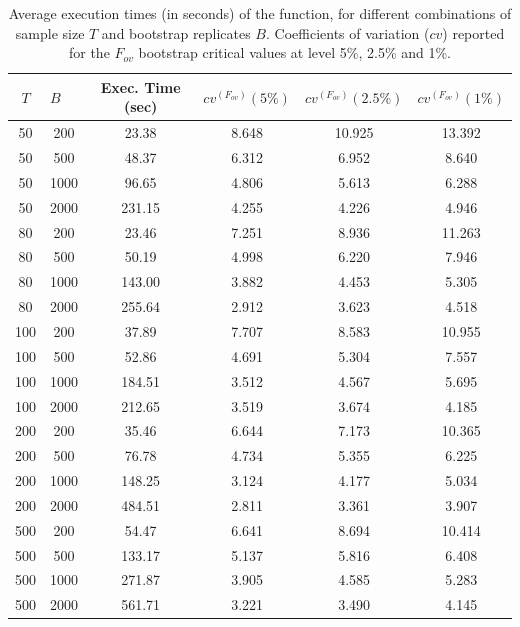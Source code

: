 \begin{table}[htbp]
  \centering
    \begin{tabular}{cccccc}
    \multicolumn{1}{c}{$T$} & \multicolumn{1}{l}{$B$} & \multicolumn{1}{c}{Exec. Time (sec)} & \multicolumn{1}{c}{$cv^{(F_{ov})}(5\%)$} & \multicolumn{1}{c}{$cv^{(F_{ov})}(2.5\%)$} & \multicolumn{1}{c}{$cv^{(F_{ov})}(1\%)$} \\
    \midrule
    50    & 200   & 23.38 & 8.648 & 10.925 & 13.392 \\
    50    & 500   & 48.37 & 6.312 & 6.952 & 8.640 \\
    50    & 1000  & 96.65 & 4.806 & 5.613 & 6.288 \\
    50    & 2000  & 231.15 & 4.255 & 4.226 & 4.946 \\
    \midrule
    80    & 200   & 23.46 & 7.251 & 8.936 & 11.263 \\
    80    & 500   & 50.19 & 4.998 & 6.220 & 7.946 \\
    80    & 1000  & 143.00 & 3.882 & 4.453 & 5.305 \\
    80    & 2000  & 255.64 & 2.912 & 3.623 & 4.518 \\
    \midrule
    100   & 200   & 37.89 & 7.707 & 8.583 & 10.955 \\
    100   & 500   & 52.86 & 4.691 & 5.304 & 7.557 \\
    100   & 1000  & 184.51 & 3.512 & 4.567 & 5.695 \\
    100   & 2000  & 212.65 & 3.519 & 3.674 & 4.185 \\
    \midrule
    200   & 200   & 35.46 & 6.644 & 7.173 & 10.365 \\
    200   & 500   & 76.78 & 4.734 & 5.355 & 6.225 \\
    200   & 1000  & 148.25 & 3.124 & 4.177 & 5.034 \\
    200   & 2000  & 484.51 & 2.811 & 3.361 & 3.907 \\
    \midrule
    500   & 200   & 54.47 & 6.641 & 8.694 & 10.414 \\
    500   & 500   & 133.17 & 5.137 & 5.816 & 6.408 \\
    500   & 1000  & 271.87 & 3.905 & 4.585 & 5.283 \\
    500   & 2000  & 561.71 & 3.221 & 3.490 & 4.145 \\
    \bottomrule
    \end{tabular}%
     \caption{Average execution times (in seconds) of the  function, for different combinations of sample size $T$ and bootstrap replicates $B$. Coefficients of variation ($cv$) reported for the $F_{ov}$ bootstrap critical values at level 5\%, 2.5\% and 1\%.}
  \label{tab:exec}%
\end{table}%

